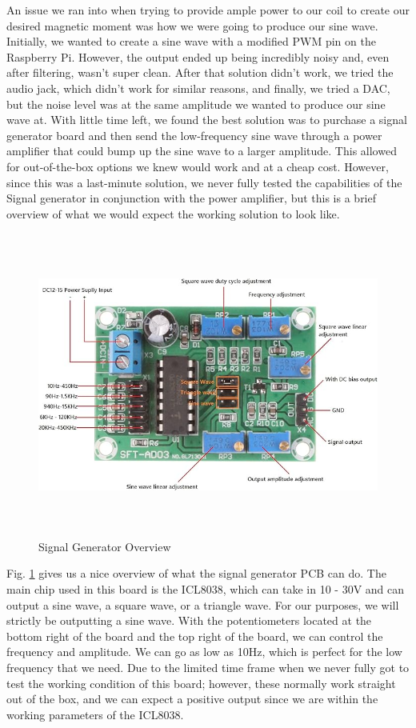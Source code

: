 An issue we ran into when trying to provide ample power to our coil to create our desired magnetic moment was how we were going to produce our sine wave. Initially, we wanted to create a sine wave with a modified PWM pin on the Raspberry Pi. However, the output ended up being incredibly noisy and, even after filtering, wasn't super clean. After that solution didn't work, we tried the audio jack, which didn't work for similar reasons, and finally, we tried a DAC, but the noise level was at the same amplitude we wanted to produce our sine wave at. With little time left, we found the best solution was to purchase a signal generator board and then send the low-frequency sine wave through a power amplifier that could bump up the sine wave to a larger amplitude. This allowed for out-of-the-box options we knew would work and at a cheap cost. However, since this was a last-minute solution, we never fully tested the capabilities of the Signal generator in conjunction with the power amplifier, but this is a brief overview of what we would expect the working solution to look like.

\begin{figure}[H]
    \centering
    \includegraphics[height=10cm]{Signal Generator.jpg}
    \caption{Signal Generator Overview}
    \label{fig:Signal Generator}
\end{figure}

Fig. \ref{fig:Signal Generator} gives us a nice overview of what the signal generator PCB can do. The main chip used in this board is the ICL8038, which can take in 10 - 30V and can output a sine wave, a square wave, or a triangle wave. For our purposes, we will strictly be outputting a sine wave. With the potentiometers located at the bottom right of the board and the top right of the board, we can control the frequency and amplitude. We can go as low as 10Hz, which is perfect for the low frequency that we need. Due to the limited time frame when we never fully got to test the working condition of this board; however, these normally work straight out of the box, and we can expect a positive output since we are within the working parameters of the ICL8038.

